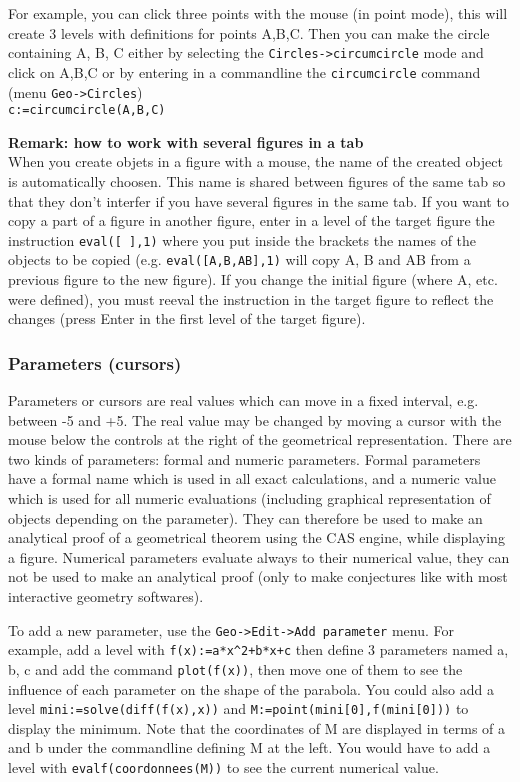 \documentclass{article}
\begin{document}
For example, you can click three points with the mouse (in point mode),
this will create 3 levels with definitions for points A,B,C.
Then you can make the circle containing A, B, C either by selecting
the \verb|Circles->circumcircle| mode and click on A,B,C
or by entering in a commandline the
\verb|circumcircle| command (menu \verb|Geo->Circles|)\\
\verb|c:=circumcircle(A,B,C)|

{\bf Remark: how to work with several figures in a tab}\\
When you create objets in a figure with a mouse, 
the name of the created object is
automatically choosen. This name is shared between figures of the same
tab so that they don't interfer if you have several figures in the
same tab. If you want to copy a part of a figure in another figure,
enter in a level of the target figure
the instruction {\tt eval([ ],1)} where you put inside the brackets
the names of the objects to be copied (e.g. {\tt eval([A,B,AB],1)}
will copy A, B and AB from a previous figure to the new figure). 
If you change the initial figure (where A,
etc. were defined), you must reeval the instruction in the target figure
to reflect the changes (press Enter in the first level of the target figure).

\subsubsection{Parameters (cursors)}
Parameters or cursors are real values which can move in a fixed interval, e.g.
between -5 and +5. The real value may be changed by moving a cursor
with the mouse below the controls at the right of the geometrical
representation. There are two kinds of parameters: formal
and numeric parameters. Formal parameters have a formal name
which is used in all exact calculations, and a numeric value
which is used for all numeric evaluations (including graphical representation
of objects depending on the parameter). They can therefore be used
to make an analytical proof of a geometrical theorem using 
the CAS engine, while displaying
a figure. Numerical parameters evaluate always to their numerical value, 
they can
not be used to make an analytical proof (only to make conjectures 
like with most interactive geometry softwares).

To add a new parameter, use the {\tt Geo->Edit->Add parameter} menu.
For example, add a level with \verb|f(x):=a*x^2+b*x+c|
then define 3 parameters named a, b, c and add the command
\verb|plot(f(x))|, then move one of them to see the 
influence of each parameter
on the shape of the parabola.
You could also add a level \verb|mini:=solve(diff(f(x),x))| and
\verb|M:=point(mini[0],f(mini[0]))| to display the minimum.
Note  that the coordinates of M are displayed in terms of a and b
under the commandline defining M at the left. You would have to add a level with
\verb|evalf(coordonnees(M))| to see the current numerical value.
\end{document}
